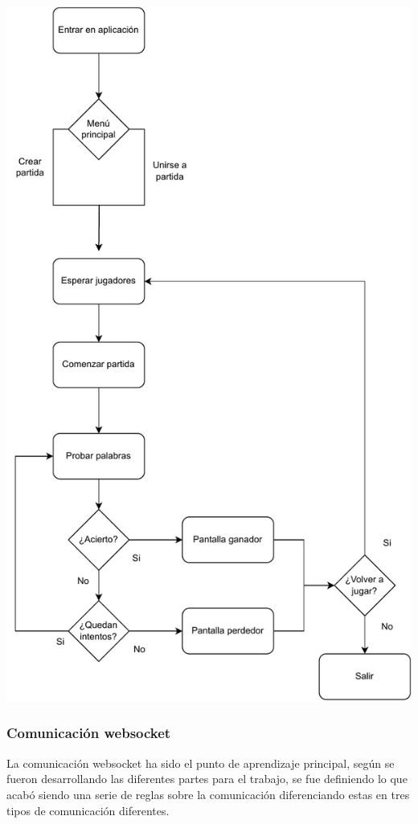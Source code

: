 \begin{center}
	\includegraphics[clip=true,width=\textwidth]{./diagrams/webapp_flow.pdf}
\end{center}

\subsubsection{Comunicación websocket}
La comunicación websocket ha sido el punto de aprendizaje principal, según se fueron desarrollando las diferentes partes para el trabajo, se fue definiendo lo que acabó siendo una serie de reglas sobre la comunicación diferenciando estas en tres tipos de comunicación diferentes.

